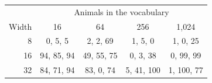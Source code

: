 \begin{tabular}{@{}rcccc@{}}
\toprule
 & \multicolumn{4}{c}{Animals in the vocabulary} \\
Width & 16 & 64 & 256 & 1{,}024 \\
\midrule
8 & 0, 5, 5 & 2, 2, 69 & 1, 5, 0 & 1, 0, 25 \\
16 & 94, 85, 94 & 49, 55, 75 & 0, 3, 38 & 0, 99, 99 \\
32 & 84, 71, 94 & 83, 0, 74 & 5, 41, 100 & 1, 100, 77 \\
\bottomrule
\end{tabular}
